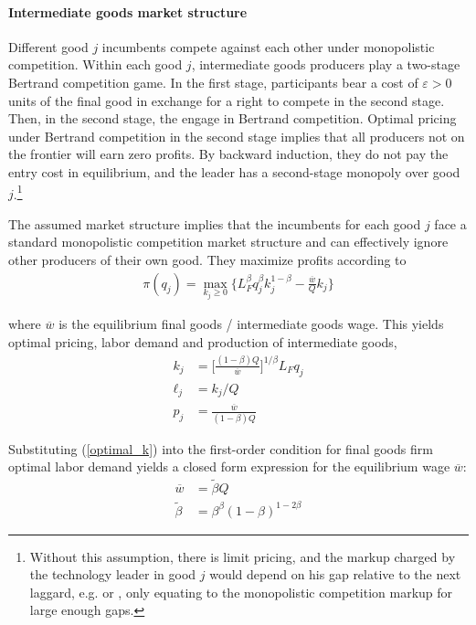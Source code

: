 \documentclass[11pt,english]{article}
\theoremstyle{remark}
\begin{document}
\paragraph{Intermediate goods market structure} Different good $j$ incumbents compete against each other under monopolistic competition. Within each good $j$, intermediate goods producers play a two-stage Bertrand competition game. In the first stage, participants bear a cost of $\varepsilon > 0$ units of the final good in exchange for a right to compete in the second stage. Then, in the second stage, the engage in Bertrand competition. Optimal pricing under Bertrand competition in the second stage implies that all producers not on the frontier will earn zero profits. By backward induction, they do not pay the entry cost in equilibrium, and the leader has a second-stage monopoly over good $j$.\footnote{Without this assumption, there is limit pricing, and the markup charged by the technology leader in good $j$ would depend on his gap relative to the next laggard, e.g. \cite{baslandze_spinout_2019} or \cite{aghion_competition_2005}, only equating to the monopolistic competition markup for large enough gaps.}

The assumed market structure implies that the incumbents for each good $j$ face a standard monopolistic competition market structure and can effectively ignore other producers of their own good. They maximize profits according to
\begin{align}
\pi(q_j) = \max_{k_j \ge 0} \Big\{ L_F^{\beta} q_j^{\beta} k_j^{1-\beta} - \frac{\overline{w}}{Q} k_j \Big\} \label{incumbent_profit}
\end{align}

where $\overline{w}$ is the equilibrium final goods / intermediate goods wage.
This yields optimal pricing, labor demand and production of intermediate goods,
\begin{align}
k_j &= \Big[ \frac{(1-\beta) Q}{\overline{w}} \Big]^{1/\beta}L_F q_j  \label{optimal_k}\\
\ell_j &= k_j / Q \label{optimal_l}\\
p_j &= \frac{\overline{w}}{(1-\beta) Q} \label{optimal_p}
\end{align}

Substituting (\ref{optimal_k}) into the first-order condition for final goods firm optimal labor demand yields a closed form expression for the equilibrium wage $\overline{w}$:
\begin{align}
\overline{w} &= \tilde{\beta} Q \label{wbar} \\
\tilde{\beta} &= \beta^{\beta} (1-\beta)^{1-2\beta} \label{def_cbeta}
\end{align}
\end{document}
